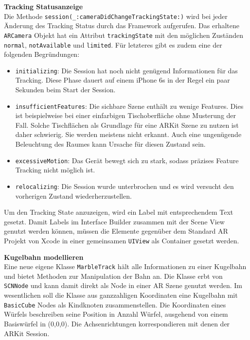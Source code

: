 \begin{description}
	\textbf{Tracking Statusanzeige} \\ %
	Die Methode \texttt{session(\_:cameraDidChangeTrackingState:)} wird bei jeder Änderung des Tracking Status durch das Framework aufgerufen. Das erhaltene \texttt{ARCamera} Objekt hat ein Attribut \texttt{trackingState} mit den möglichen Zuständen \texttt{normal}, \texttt{notAvailable} und \texttt{limited}. Für letzteres gibt es zudem eine der folgenden Begründungen:
	\begin{itemize}
		\item \texttt{initializing}: Die Session hat noch nicht genügend Informationen für das Tracking. Diese Phase dauert auf einem iPhone 6s in der Regel ein paar Sekunden beim Start der Session.
		\item \texttt{insufficientFeatures}: Die sichbare Szene enthält zu wenige Features. Dies ist beispielweise bei einer einfarbigen Tischoberfläche ohne Musterung der Fall. Solche Tischflächen als Grundlage für eine ARKit Szene zu nutzen ist daher schwierig. Sie werden meistens nicht erkannt. Auch eine ungenügende Beleuchtung des Raumes kann Ursache für diesen Zustand sein.
		\item \texttt{excessiveMotion}: Das Gerät bewegt sich zu stark, sodass präzises Feature Tracking nicht möglich ist.
		\item \texttt{relocalizing}: Die Session wurde unterbrochen und es wird versucht den vorherigen Zustand wiederherzustellen.
	\end{itemize}
	Um den Tracking State anzuzeigen, wird ein Label mit entsprechendem Text gesetzt. Damit Labels im Interface Builder zusammen mit der Scene View genutzt werden können, müssen die Elemente gegenüber dem Standard AR Projekt von Xcode in einer gemeinsamen \texttt{UIView} als Container gesetzt werden.

	\textbf{Kugelbahn modellieren}\\
	Eine neue eigene Klasse \texttt{MarbleTrack} hält alle Informationen zu einer Kugelbahn und bietet Methoden zur Manipulation der Bahn an. Die Klasse erbt von \texttt{SCNNode} und kann damit direkt als Node in einer AR Szene genutzt werden. Im wesentlichen soll die Klasse aus ganzzahligen Koordinaten eine Kugelbahn mit \texttt{BasicCube} Nodes als Kindknoten zusammenstellen. Die Koordinaten eines Würfels beschreiben seine Position in Anzahl Würfel, ausgehend von einem Basiswürfel in (0,0,0). Die Achsenrichtungen korrespondieren mit denen der ARKit Session.


\end{description}
